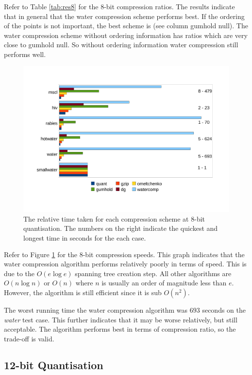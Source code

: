 \documentclass[a4paper]{report}
\begin{document}
Refer to Table \ref{tab:res8} for the $8$-bit compression ratios. The results
indicate that in general that the water compression scheme performs best. If
the ordering of the points is not important, the best scheme is
\citet{gumholdcomp} (see column gumhold null). The water compression scheme
without ordering information has ratios which are very close to gumhold
null. So without ordering information water compression still performs well.

\begin{figure}[h]
\centering
\includegraphics[trim = 10mm 25mm 10mm 20mm, clip, width=\textwidth]{images/speed8}
\caption{The relative time taken for each compression scheme at $8$-bit
  quantisation. The numbers on the right indicate the quickest and longest
  time in seconds for the each case.}
\label{fig:speed8}
\end{figure}

Refer to Figure \ref{fig:speed8} for the $8$-bit compression speeds. This
graph indicates that the water compression algorithm performs relatively
poorly in terms of speed. This is due to the $O(e \log e)$ spanning tree
creation step. All other algorithms are $O(n \log n)$ or $O(n)$ where $n$ is
usually an order of magnitude less than $e$. However, the algorithm is still
efficient since it is sub $O(n^2)$.

The worst running time the water compression algorithm was $693$ seconds on
the \emph{water} test case. This further indicates that it may be worse
relatively, but still acceptable. The algorithm performs best in terms of
compression ratio, so the trade-off is valid.


\subsection{12-bit Quantisation}
\end{document}
